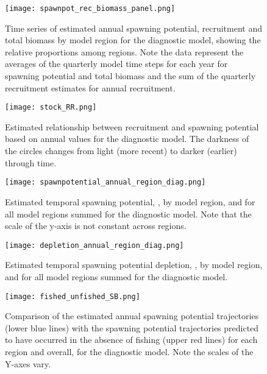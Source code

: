 \newpage
\begin{figure}[!ht]
  \centering
  \texttt{[image: spawnpot\_rec\_biomass\_panel.png]}
  \caption{Time series of estimated annual spawning potential, recruitment and total biomass by model region for the diagnostic model, showing the relative proportions among regions. Note the data represent the averages of the quarterly model time steps for each year for spawning potential and total biomass and the sum of the quarterly recruitment estimates for annual recruitment. \label{fig:spawnpot_rec_biomass_panel}}
\end{figure}
\clearpage

\newpage
\begin{figure}[!ht]
  \centering
  \texttt{[image: stock\_RR.png]}
  \caption{Estimated relationship between recruitment and spawning potential based on annual values for the diagnostic model. The darkness of the circles changes from light (more recent) to darker (earlier) through time.\label{fig:stock_RR}}
\end{figure}
\clearpage

\newpage
\begin{figure}[!ht]
  \centering
  \texttt{[image: spawnpotential\_annual\_region\_diag.png]}
  \caption{Estimated temporal spawning potential, \sbt, by model region, and for all model regions summed for the diagnostic model. Note that the scale of the y-axis is not constant across regions.\label{fig:spawnpotential_annual_region_diag}}
\end{figure}
\clearpage

\newpage
\begin{figure}[!ht]
  \centering
  \texttt{[image: depletion\_annual\_region\_diag.png]}
  \caption{Estimated temporal spawning potential depletion, \sbtsbfo, by model region, and for all model regions summed for the diagnostic model. \label{fig:depletion_annual_region_diag}}
\end{figure}
\clearpage

\newpage
\begin{figure}[!ht]
  \centering
  \texttt{[image: fished\_unfished\_SB.png]}
  \caption{Comparison of the estimated annual spawning potential trajectories (lower blue lines) with the spawning potential trajectories predicted to have occurred in the absence of fishing (upper red lines) for each region and overall, for the diagnostic model. Note the scales of the Y-axes vary. \label{fig:fished_unfished_SB}}
\end{figure}
\clearpage

